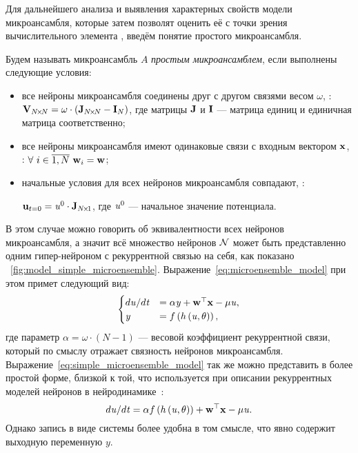 Для дальнейшего анализа и выявления характерных свойств модели микроансамбля, которые затем позволят оценить её с точки зрения вычислительного элемента , введём понятие простого микроансамбля.
\begin{Definition*}
    Будем называть микроансамбль $A$ \textit{простым микроансамблем}, если выполнены следующие условия:
    \begin{itemize}
        \item все нейроны микроансамбля соединены друг с другом связями весом $\omega$, \ie: $\mathrm{\mathbf{V}}_{N\!\times\!N} = \omega \cdot \left( \mathrm{\mathbf{J}}_{N\!\times\!N} - \mathrm{\mathbf{I}}_{N} \right)$, где матрицы $\mathrm{\mathbf{J}}$ и $\mathrm{\mathbf{I}}$  --- матрица единиц и единичная матрица соответственно;
        \item все нейроны микроансамбля имеют одинаковые связи с входным вектором $\mathrm{\mathbf{x}}$, \ie: $\forall\ i \in \overline{1,N}\ \mathrm{\mathbf{w}}_{i} = \mathrm{\mathbf{w}}$;
        \item начальные условия для всех нейронов микроансамбля совпадают, \ie: \par $\mathrm{\mathbf{u}}_{t=0} = \mathit{u}^{0} \cdot \mathrm{\mathbf{J}}_{N\!\times\!1}$, где $\mathit{u}^{0}$ --- начальное значение потенциала.
    \end{itemize}
\end{Definition*}

В этом случае можно говорить об эквивалентности всех нейронов микроансамбля, а значит всё множество нейронов $\mathcal{N}$ может быть представленно одним гипер-нейроном с рекуррентной связью на себя, как показано \onfigure~\ref{fig:model_simple_microensemble}. Выражение~\eqref{eq:microensemble_model} при этом примет следующий вид:
\begin{equation}
    \label{eq:simple_microensemble_model}
    \begin{cases}
        d\mathit{u}/d\mathit{t} &= \alpha \mathit{y} + \mathrm{\mathbf{w}}^{\top} \mathrm{\mathbf{x}} - \mu \mathit{u}, \\
        \mathit{y}              &= f\left( h\left( \mathit{u}, \theta \right) \right), \\
    \end{cases}
\end{equation}
где параметр $\alpha = \omega \cdot \left( N - 1 \right)$ --- весовой коэффициент рекуррентной связи, который по смыслу отражает связность нейронов микроансамбля. Выражение~\eqref{eq:simple_microensemble_model} так же можно представить в более простой форме, близкой к той, что используется при описании рекуррентных моделей нейронов в нейродинамике~\cite{Haykin2008}:
\begin{equation}
    \label{eq:simple_microensemble_model_plain}
    d\mathit{u}/d\mathit{t} = \alpha f\left( h\left( \mathit{u}, \theta \right) \right) + \mathrm{\mathbf{w}}^{\top} \mathrm{\mathbf{x}} - \mu \mathit{u}.
\end{equation}
Однако запись в виде системы более удобна в том смысле, что явно содержит выходную переменную $y$.

